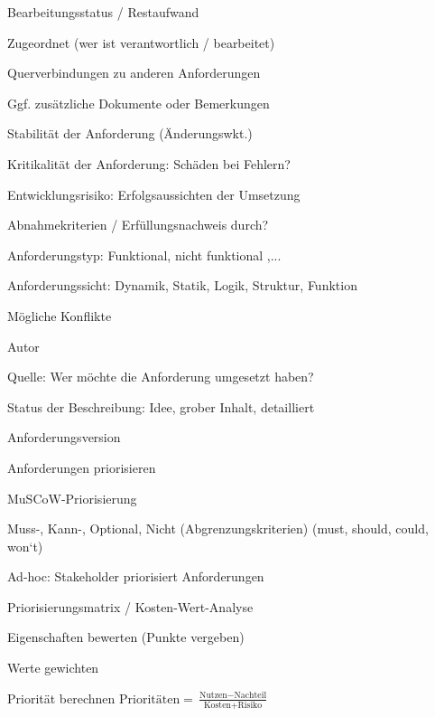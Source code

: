 \documentclass[a4paper]{article}
\begin{document}
\begin{multicols}{3}
\begin{itemize*}
\begin{itemize*}
\begin{itemize*}
                    \item Bearbeitungsstatus / Restaufwand
                    \item Zugeordnet (wer ist verantwortlich / bearbeitet)
                    \item Querverbindungen zu anderen Anforderungen
                    \item Ggf. zusätzliche Dokumente oder Bemerkungen
                    \item Stabilität der Anforderung (Änderungswkt.)
                    \item Kritikalität der Anforderung: Schäden bei Fehlern?
                    \item Entwicklungsrisiko: Erfolgsaussichten der Umsetzung
                    \item Abnahmekriterien / Erfüllungsnachweis durch?
                    \item Anforderungstyp: Funktional, nicht funktional ,...
                    \item Anforderungssicht: Dynamik, Statik, Logik, Struktur, Funktion
                    \item Mögliche Konflikte
                    \item Autor
                    \item Quelle: Wer möchte die Anforderung umgesetzt haben?
                    \item Status der Beschreibung: Idee, grober Inhalt, detailliert
                    \item Anforderungsversion
                  \end{itemize*}
          \end{itemize*}
    \item Anforderungen priorisieren
          \begin{itemize*}
            \item MuSCoW-Priorisierung
            \item Muss-, Kann-, Optional, Nicht (Abgrenzungskriterien) (must, should, could, won‘t)
            \item Ad-hoc: Stakeholder priorisiert Anforderungen
            \item Priorisierungsmatrix / Kosten-Wert-Analyse
                  \begin{itemize*}
                    \item Eigenschaften bewerten (Punkte vergeben)
                    \item Werte gewichten
                    \item Priorität berechnen $\text{Prioritäten} = \frac{\text{Nutzen} - \text{Nachteil}}{\text{Kosten} + \text{Risiko}}$

\end{itemize*}
\end{itemize*}
\end{itemize*}
\end{multicols}
\end{document}
